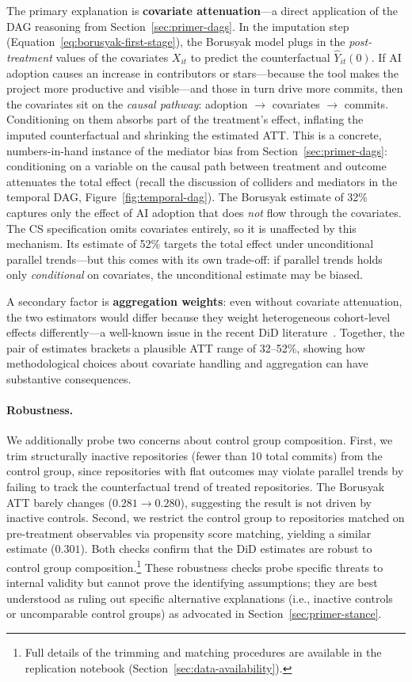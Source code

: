 The primary explanation is \textbf{covariate attenuation}---a direct application of the DAG reasoning from Section~\ref{sec:primer-dags}.
In the imputation step (Equation~\ref{eq:borusyak-first-stage}), the Borusyak model plugs in the \emph{post-treatment} values of the covariates $X_{it}$ to predict the counterfactual $\hat{Y}_{it}(0)$.
If AI adoption causes an increase in contributors or stars---because the tool makes the project more productive and visible---and those in turn drive more commits, then the covariates sit on the \emph{causal pathway}: adoption $\to$ covariates $\to$ commits.
Conditioning on them absorbs part of the treatment's effect, inflating the imputed counterfactual and shrinking the estimated ATT\@.
This is a concrete, numbers-in-hand instance of the mediator bias from Section~\ref{sec:primer-dags}: conditioning on a variable on the causal path between treatment and outcome attenuates the total effect (recall the discussion of colliders and mediators in the temporal DAG, Figure~\ref{fig:temporal-dag}).
The Borusyak estimate of 32\% captures only the effect of AI adoption that does \emph{not} flow through the covariates.
The CS specification omits covariates entirely, so it is unaffected by this mechanism.
Its estimate of 52\% targets the total effect under unconditional parallel trends---but this comes with its own trade-off: if parallel trends holds only \emph{conditional} on covariates, the unconditional estimate may be biased.

A secondary factor is \textbf{aggregation weights}: even without covariate attenuation, the two estimators would differ because they weight heterogeneous cohort-level effects differently---a well-known issue in the recent DiD literature~\cite{roth2023whats}.
Together, the pair of estimates brackets a plausible ATT range of 32--52\%, showing how methodological choices about covariate handling and aggregation can have substantive consequences.

\paragraph{Robustness.}
\label{sec:robustness}

We additionally probe two concerns about control group composition.
First, we trim structurally inactive repositories (fewer than 10 total commits) from the control group, since repositories with flat outcomes may violate parallel trends by failing to track the counterfactual trend of treated repositories.
The Borusyak ATT barely changes ($0.281 \to 0.280$), suggesting the result is not driven by inactive controls.
Second, we restrict the control group to repositories matched on pre-treatment observables via propensity score matching, yielding a similar estimate ($0.301$).
Both checks confirm that the DiD estimates are robust to control group composition.\footnote{Full details of the trimming and matching procedures are available in the replication notebook (Section~\ref{sec:data-availability}).}
These robustness checks probe specific threats to internal validity but cannot prove the identifying assumptions; they are best understood as ruling out specific alternative explanations (i.e., inactive controls or uncomparable control groups) as advocated in Section~\ref{sec:primer-stance}.

